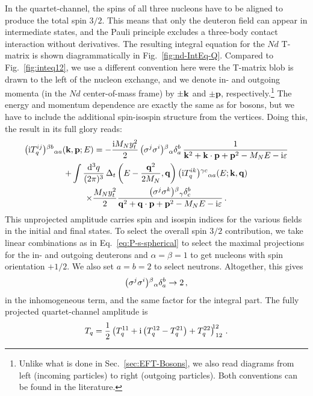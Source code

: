 In the quartet-channel, the spins of all three nucleons have to be aligned to 
produce the total spin $3/2$.  This means that only the deuteron field can 
appear in intermediate states, and the Pauli principle excludes a three-body 
contact interaction without derivatives.  The resulting integral equation for 
the $Nd$ T-matrix is shown diagrammatically in Fig.~\ref{fig:nd-IntEq-Q}.  
Compared to Fig.~\ref{fig:inteq12}, we use a different convention here were the 
T-matrix blob is drawn to the left of the nucleon exchange, and we denote in- 
and outgoing momenta (in the $Nd$ center-of-mass frame) by $\pm\mathbf{k}$ and 
$\pm{\mathbf{p}}$, respectively.\footnote{Unlike what is done in 
Sec.~\ref{sec:EFT-Bosons}, we also read diagrams from left (incoming particles) 
to right (outgoing particles).  Both conventions can be found in the 
literature.}  The energy and momentum dependence are exactly the same as for 
bosons, but we have to include the additional spin-isospin structure from the 
vertices.  Doing this, the result in its full glory reads:
%
\begin{multline}
 \idxx{\ii T_q^{ij}}{\beta b}{\alpha a}(\vk,{\mathbf{p}};E)
 = -\frac{\ii\MN\yt^2}{2}\,\idxx{\sigma^j\sigma^i}\beta\alpha\delta^b_a
 \,\frac{1}{\vk^2+\vk\cdot{\mathbf{p}}+{\mathbf{p}}^2-\MN E-\ii\eps}\\
 +\int\frac{\dd^3 q}{(2\pi)^3} \,
 \Delta_t\left(E-\frac{\vq^2}{2\MN},\vq\right)
 \idxx{\ii T_q^{ik}}{\gamma c}{\alpha a}(E;\vk,\vq)\\
 \times\frac{\MN\yt^2}{2}
 \frac{\idxx{\sigma^j\sigma^k}\beta\gamma\delta^b_c}
 { \vq^2+\vq\cdot{\mathbf{p}}+{\mathbf{p}}^2-\MN E-\ii\eps} \,.
\label{eq:nd-IntEq-Q-raw}
\end{multline}
%
This unprojected amplitude carries spin and isospin indices for the various 
fields in the initial and final states.  To select the overall spin $3/2$ 
contribution, we take linear combinations as in Eq.~\eqref{eq:P-s-spherical} to 
select the maximal projections for the in- and outgoing deuterons and 
$\alpha=\beta=1$ to get nucleons with spin orientation ${+}1/2$.  We also set 
$a=b=2$ to select neutrons.  Altogether, this gives
%
\begin{equation}
 \big(\sigma^j\sigma^i\big){}^{\beta}{}_{\alpha}\delta^b_a \rightarrow 2 \,,
\end{equation}
%
in the inhomogeneous term, and the same factor for the integral part.  The 
fully projected quartet-channel amplitude is
%
\begin{equation}
 T_q = \frac{1}{2}\idxxx{T_q^{11} + \ii\left(T_q^{12} - T_q^{21}\right)
 + T_q^{22}}{12}{12} \,.
\label{eq:T-q}
\end{equation}

